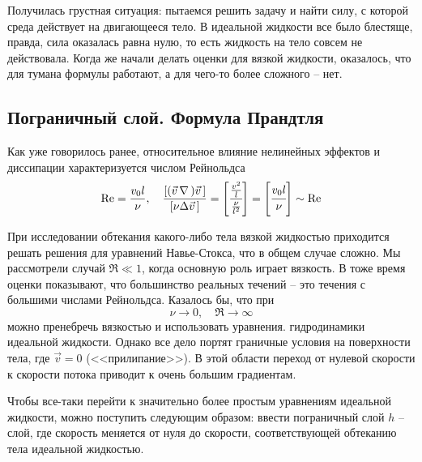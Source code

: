 Получилась грустная ситуация: пытаемся решить задачу и найти силу, с которой среда действует на двигающееся тело. 
В идеальной жидкости все было блестяще, правда, сила оказалась равна нулю, то есть жидкость на тело совсем не действовала. Когда же начали делать оценки для  вязкой жидкости, оказалось, что для тумана  формулы работают, а для чего-то более сложного -- нет.

\subsection{Пограничный слой. Формула Прандтля}

 Как уже говорилось ранее, относительное влияние нелинейных эффектов и диссипации характеризуется числом Рейнольдса
\begin{equation}
    \Re = \frac{v_0 l}{\nu}, \quad \frac{[(\vec{v}\, \nabla\,)\vec{v}\,]}{[\nu \Delta \vec{v}\,]}= 
    \qty[
    	\cfrac{\frac{v^2}{l}}{\frac{\nu}{l^2}}
    	]=\qty[\cfrac{v_0 l}{\nu}] \sim \Re
\end{equation}

При исследовании обтекания какого-либо тела вязкой жидкостью приходится решать решения для уравнений Навье-Стокса, что в общем случае сложно.
Мы рассмотрели случай  $\Re \ll 1$, когда основную роль играет вязкость. В тоже время оценки показывают, что большинство реальных течений -- это течения с большими числами Рейнольдса. Казалось бы, что при   
\begin{equation}
 	\nu \to 0, \quad \Re \to \infty
 \end{equation} 
можно пренебречь вязкостью и использовать уравнения. гидродинамики идеальной жидкости. Однако все дело портят граничные условия на поверхности тела, где $\vec{v}=0$ (<<прилипание>>). В этой области переход от нулевой скорости к скорости потока приводит к очень большим градиентам. 

Чтобы все-таки перейти к значительно более простым уравнениям идеальной жидкости, можно поступить следующим образом: ввести пограничный слой $h$ -- слой, где скорость меняется от нуля до скорости, соответствующей обтеканию тела идеальной жидкостью\footnotemark.

